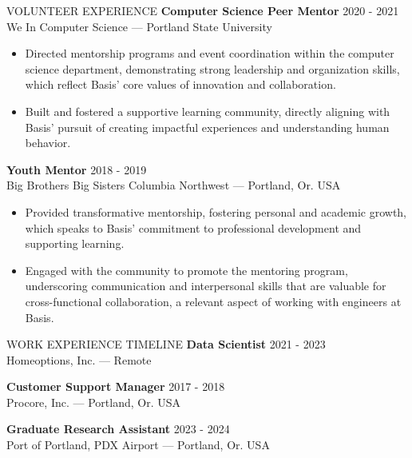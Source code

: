 \documentclass{resume}
\begin{document}
\begin{rSection}{VOLUNTEER EXPERIENCE}
\textbf{Computer Science Peer Mentor} \hfill 2020 - 2021 \\
We In Computer Science --- Portland State University \\
\begin{itemize}
    \item Directed mentorship programs and event coordination within the computer science department, demonstrating strong leadership and organization skills, which reflect Basis' core values of innovation and collaboration.
    \item Built and fostered a supportive learning community, directly aligning with Basis' pursuit of creating impactful experiences and understanding human behavior.
\end{itemize}

\textbf{Youth Mentor} \hfill 2018 - 2019 \\
Big Brothers Big Sisters Columbia Northwest --- Portland, Or. USA \\
\begin{itemize}
    \item Provided transformative mentorship, fostering personal and academic growth, which speaks to Basis' commitment to professional development and supporting learning.
    \item Engaged with the community to promote the mentoring program, underscoring communication and interpersonal skills that are valuable for cross-functional collaboration, a relevant aspect of working with engineers at Basis.
\end{itemize}
\end{rSection}

\begin{rSection}{WORK EXPERIENCE TIMELINE}
\textbf{Data Scientist} \hfill 2021 - 2023 \\
Homeoptions, Inc. --- Remote

\textbf{Customer Support Manager} \hfill 2017 - 2018 \\
Procore, Inc. --- Portland, Or. USA

\textbf{Graduate Research Assistant} \hfill 2023 - 2024 \\
Port of Portland, PDX Airport --- Portland, Or. USA
\end{rSection}
\end{document}
